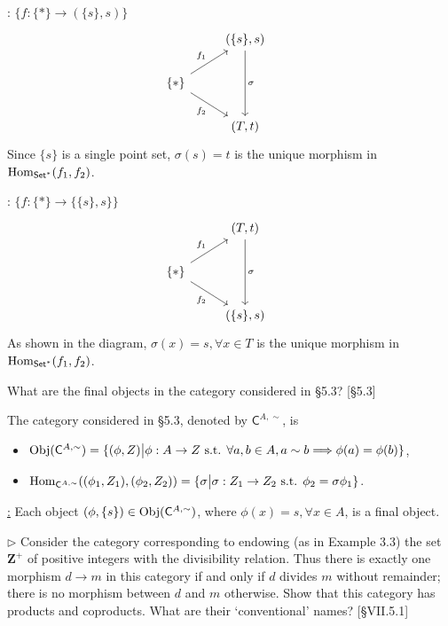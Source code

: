\begin{solution}
\underline{}: $\{f: \{\ast\}\to (\{s\},s)\}$
%
\[
\begin{tikzcd}
& (\{s\},s) \arrow[dd, "\sigma"]\\
\{\ast\} \arrow[ur, "f_1"] \arrow[dr, "f_2"'] &\\
& (T,t) &
\end{tikzcd}
\]
Since $\{s\}$ is a single point set, $\sigma(s)=t$ is the unique morphism in $\mathrm{Hom}_{\mathsf{Set}^{\ast}}(f_1, f_2)$. 

\noindent \underline{}: $\{f: \{\ast\}\to \{\{s\},s\}\}$
%
\[
\begin{tikzcd}
& (T,t) \arrow[dd, "\sigma"]\\
\{\ast\} \arrow[ur, "f_1"] \arrow[dr, "f_2"'] &\\
& (\{s\},s) &
\end{tikzcd}
\]
As shown in the diagram, $\sigma(x) = s, \forall x\in T$ is the unique morphism in $\mathrm{Hom}_{\mathsf{Set}^{\ast}}(f_1, f_2)$.
\end{solution}

\begin{problem}[5.5]
 What are the final objects in the category considered in \S5.3? [\S5.3]
\end{problem}

\begin{solution}
The category considered in \S5.3, denoted by $\mathsf{C}^{A,\sim}$, is
\begin{itemize}
\item $\mathrm{Obj}(\mathsf{C}^{A,\sim})=\{(\phi, Z) \big{|} \phi: A\to Z \text{ s.t. } \forall a,b\in A, a\sim b \Longrightarrow \phi(a) = \phi(b)\}$,
\item $\mathrm{Hom}_{\mathsf{C}^{A,\sim}}((\phi_1, Z_1), (\phi_2, Z_2))=\{\sigma\big{|} \sigma: Z_1\to Z_2\text{ s.t. } \phi_2 = \sigma\phi_1\}$.
\end{itemize}
\underline{:} Each object $(\phi, \{s\})\in \mathrm{Obj}(\mathsf{C}^{A,\sim})$, where $\phi(x) = s, \forall x\in A$, is a final object. 
\end{solution}

\begin{problem}[5.6]
  $\rhd$ Consider the category corresponding to endowing (as in Example 3.3) the set
  $\mathbf{Z}^+$ of positive integers with the divisibility relation. Thus there
  is exactly one morphism $d\to m$ in this category if and only if $d$ divides $m$
  without remainder; there is no morphism between $d$ and $m$ otherwise. Show that
  this category has products and coproducts. What are their `conventional' names?
  [\S VII.5.1]
\end{problem}


